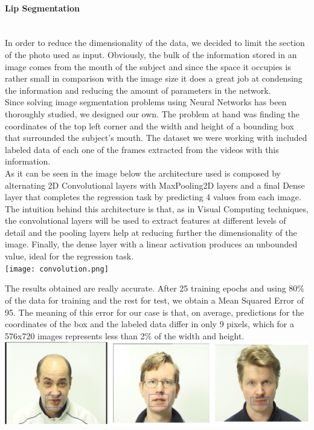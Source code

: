 \documentclass{article}[10pt]
\begin{document}
\begin{multicols}{2}
\paragraph{Lip Segmentation} ~\\

In order to reduce the dimensionality of the data, we decided to limit the
section of the photo used as input. Obviously, the bulk of the
information stored in an image comes from the mouth of the subject and since the
space it occupies is rather small in comparison with the image size it does a
great job at condensing the information and reducing the amount of parameters in
the network.\\

Since solving image segmentation problems using Neural Networks has been
thoroughly studied, we designed our own. The problem at hand was finding the
coordinates of the top left corner and the width and height of a bounding box
that surrounded the subject's mouth. The dataset we were working with included
labeled data of each one of the frames extracted from the videos with this
information. \\

As it can be seen in the image below the architecture used is composed by alternating
2D Convolutional layers with MaxPooling2D layers and a final Dense layer that
completes the regression task by predicting 4 values from each image. The
intuition behind this architecture is that, as in Visual Computing techniques,
the convolutional layers will be used to extract features at different levels of
detail and the pooling layers help at reducing further the dimensionality of the
image. Finally, the dense layer with a linear activation produces an unbounded
value, ideal for the regression task.\\

\texttt{[image: convolution.png]}

The results obtained are really accurate. After 25 training epochs and using 80\%
of the data for training and the rest for test, we obtain a Mean Squared Error of
95. The meaning of this error for our case is that, on average, predictions
for the coordinates of the box and the labeled data differ in only 9 pixels, which
for a 576x720 images represents less than 2\% of the width and height.\\

\includegraphics[width=0.8\linewidth, keepaspectratio]{boxes.png}


\end{multicols}
\end{document}
